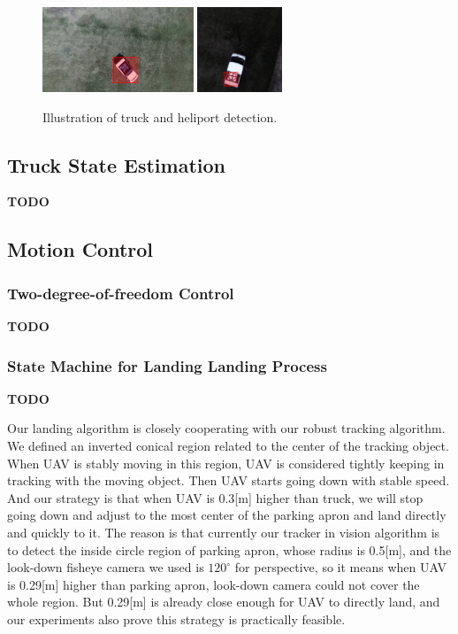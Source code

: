 \documentclass{standalone}
\begin{document}
\begin{figure}[t!]
  \centering
  \includegraphics[height=1in]{sections/task1/images/detect2}
  \includegraphics[height=1in]{sections/task1/images/detect1}
  \caption{Illustration of truck and heliport detection.}
\end{figure}

\subsection{Truck State Estimation}

{\bf TODO}

\subsection{Motion Control}

\subsubsection{Two-degree-of-freedom Control}
{\bf TODO}

\subsubsection{State Machine for Landing Landing Process}
{\bf TODO}

Our landing algorithm is closely cooperating with our robust tracking algorithm. We defined an inverted conical region related to the center of the tracking object. When UAV is stably moving in this region, UAV is considered tightly keeping in tracking with the moving object. Then UAV starts going down with stable speed. And our strategy is that when UAV is 0.3[m] higher than truck, we will stop going down and adjust to the most center of the parking apron and land directly and quickly to it. The reason is that currently our tracker in vision algorithm is to detect the inside circle region of parking apron, whose radius is 0.5[m], and the look-down fisheye camera we used is $120^\circ$  for perspective, so it means when UAV is 0.29[m] higher than parking apron, look-down camera could not cover the whole region. But 0.29[m] is already close enough for UAV to directly land, and our experiments also prove this strategy is practically feasible.
\end{document}
